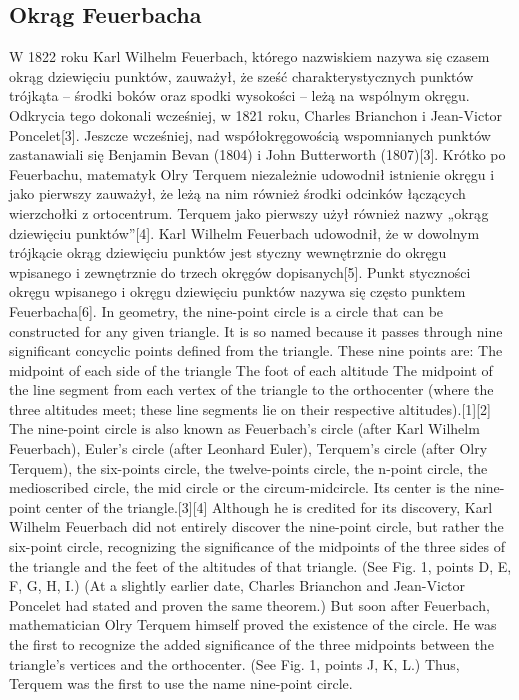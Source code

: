 %

\subsection{Okrąg Feuerbacha}
W 1822 roku Karl Wilhelm Feuerbach, którego nazwiskiem nazywa się czasem okrąg dziewięciu punktów, zauważył, że sześć charakterystycznych punktów trójkąta – środki boków oraz spodki wysokości – leżą na wspólnym okręgu. Odkrycia tego dokonali wcześniej, w 1821 roku, Charles Brianchon i Jean-Victor Poncelet[3]. Jeszcze wcześniej, nad współokręgowością wspomnianych punktów zastanawiali się Benjamin Bevan (1804) i John Butterworth (1807)[3].
Krótko po Feuerbachu, matematyk Olry Terquem niezależnie udowodnił istnienie okręgu i jako pierwszy zauważył, że leżą na nim również środki odcinków łączących wierzchołki z ortocentrum. Terquem jako pierwszy użył również nazwy „okrąg dziewięciu punktów”[4].
Karl Wilhelm Feuerbach udowodnił, że w dowolnym trójkącie okrąg dziewięciu punktów jest styczny wewnętrznie do okręgu wpisanego i zewnętrznie do trzech okręgów dopisanych[5]. Punkt styczności okręgu wpisanego i okręgu dziewięciu punktów nazywa się często punktem Feuerbacha[6].
In geometry, the nine-point circle is a circle that can be constructed for any given triangle. It is so named because it passes through nine significant concyclic points defined from the triangle. These nine points are:
The midpoint of each side of the triangle
The foot of each altitude
The midpoint of the line segment from each vertex of the triangle to the orthocenter (where the three altitudes meet; these line segments lie on their respective altitudes).[1][2]
The nine-point circle is also known as Feuerbach's circle (after Karl Wilhelm Feuerbach), Euler's circle (after Leonhard Euler), Terquem's circle (after Olry Terquem), the six-points circle, the twelve-points circle, the n-point circle, the medioscribed circle, the mid circle or the circum-midcircle. Its center is the nine-point center of the triangle.[3][4]
Although he is credited for its discovery, Karl Wilhelm Feuerbach did not entirely discover the nine-point circle, but rather the six-point circle, recognizing the significance of the midpoints of the three sides of the triangle and the feet of the altitudes of that triangle. (See Fig. 1, points D, E, F, G, H, I.) (At a slightly earlier date, Charles Brianchon and Jean-Victor Poncelet had stated and proven the same theorem.) But soon after Feuerbach, mathematician Olry Terquem himself proved the existence of the circle. He was the first to recognize the added significance of the three midpoints between the triangle's vertices and the orthocenter. (See Fig. 1, points J, K, L.) Thus, Terquem was the first to use the name nine-point circle.
